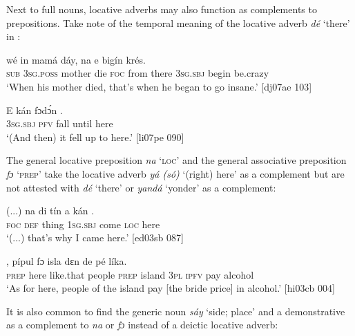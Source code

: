 Next to full nouns, locative adverbs may also function as complements to prepositions. Take note of the temporal meaning of the locative adverb \textit{dé} ‘there’ in :


\ea%
    \label{ex:key:902}
    \gll wé  in    mamá  dáy,  na          e    bigín  krés.\\
\textsc{sub}  \textsc{3sg.poss}  mother  die  \textsc{foc}  from  there  \textsc{3sg.sbj}  begin  be.crazy\\

\glt ‘When his mother died, that’s when he began to go insane.’ [dj07ae 103]
\z


\ea%
    \label{ex:key:903}
    \gll E    kán    fɔdɔ́n      .\\
\textsc{3sg.sbj}  \textsc{pfv}    fall    until  here\\

\glt ‘(And then) it fell up to here.’ [li07pe 090]
\z

The general locative preposition \textit{na} ‘\textsc{loc}’ and the general associative preposition \textit{fɔ} ‘\textsc{prep}’ take the locative adverb \textit{yá (só)} ‘(right) here’ as a complement but are not attested with \textit{dé} ‘there’ or\textit{ yandá} ‘yonder’ as a complement: 


\ea%
    \label{ex:key:904}
    \gll (...)  na  di  tín    a    kán      .\\
{}  \textsc{foc}  \textsc{def}  thing  \textsc{1sg.sbj}  come  \textsc{loc}  here\\

\glt ‘(...) that’s why I came here.’ [ed03sb 087]
\z


\ea%
    \label{ex:key:905}
    \gll {}      ,    pípul  fɔ  isla    dɛn  de  pé  líka.\\
\textsc{prep}  here    like.that  people  \textsc{prep}  island  \textsc{3pl}  \textsc{ipfv}  pay  alcohol\\

\glt ‘As for here, people of the island pay [the bride price] in alcohol.’ [hi03cb 004]
\z

It is also common to find the generic noun \textit{sáy} ‘side; place’ and a demonstrative as a complement to \textit{na} or \textit{fɔ} instead of a deictic locative adverb: 


